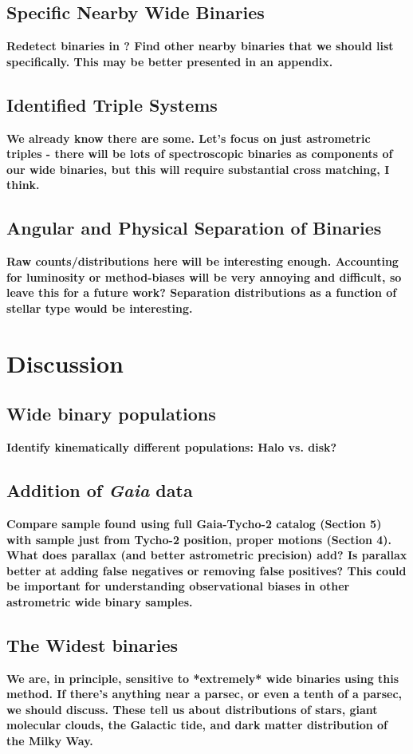 \documentclass[usenatbib]{mnras}
\begin{document}
\subsection{Specific Nearby Wide Binaries}
{\bf Redetect binaries in \citet{shaya11}? Find other nearby binaries that we should list specifically. This may be better presented in an appendix.}

\subsection{Identified Triple Systems} 
{\bf We already know there are some. Let's focus on just astrometric triples - there will be lots of spectroscopic binaries as components of our wide binaries, but this will require substantial cross matching, I think.}

\subsection{Angular and Physical Separation of Binaries}
{\bf Raw counts/distributions here will be interesting enough. Accounting for luminosity or method-biases will be very annoying and difficult, so leave this for a future work? Separation distributions as a function of stellar type would be interesting.}




\section{Discussion}

\subsection{Wide binary populations}
{\bf Identify kinematically different populations: Halo vs. disk?}

\subsection{Addition of {\it Gaia} data}
{\bf Compare sample found using full Gaia-Tycho-2 catalog (Section 5) with sample just from Tycho-2 position, proper motions (Section 4).  What does parallax (and better astrometric precision) add? Is parallax better at adding false negatives or removing false positives? This could be important for understanding observational biases in other astrometric wide binary samples.}

\subsection{The Widest binaries}
{\bf We are, in principle, sensitive to *extremely* wide binaries using this method. If there's anything near a parsec, or even a tenth of a parsec, we should discuss. These tell us about distributions of stars, giant molecular clouds, the Galactic tide, and dark matter distribution of the Milky Way. }
\end{document}
